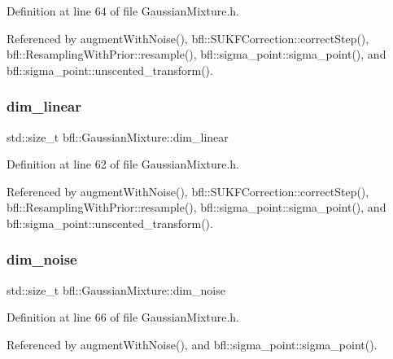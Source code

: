 Definition at line 64 of file Gaussian\+Mixture.\+h.



Referenced by augment\+With\+Noise(), bfl\+::\+S\+U\+K\+F\+Correction\+::correct\+Step(), bfl\+::\+Resampling\+With\+Prior\+::resample(), bfl\+::sigma\+\_\+point\+::sigma\+\_\+point(), and bfl\+::sigma\+\_\+point\+::unscented\+\_\+transform().

\mbox{\label{classbfl_1_1GaussianMixture_a22a0fbc77f90d9d75e89d7898484c05a}} 
\subsubsection{\texorpdfstring{dim\+\_\+linear}{dim\_linear}}
{\footnotesize\ttfamily std\+::size\+\_\+t bfl\+::\+Gaussian\+Mixture\+::dim\+\_\+linear}



Definition at line 62 of file Gaussian\+Mixture.\+h.



Referenced by augment\+With\+Noise(), bfl\+::\+S\+U\+K\+F\+Correction\+::correct\+Step(), bfl\+::\+Resampling\+With\+Prior\+::resample(), bfl\+::sigma\+\_\+point\+::sigma\+\_\+point(), and bfl\+::sigma\+\_\+point\+::unscented\+\_\+transform().

\mbox{\label{classbfl_1_1GaussianMixture_adaa8d9c6d03be835769cc848aba81067}} 
\subsubsection{\texorpdfstring{dim\+\_\+noise}{dim\_noise}}
{\footnotesize\ttfamily std\+::size\+\_\+t bfl\+::\+Gaussian\+Mixture\+::dim\+\_\+noise}



Definition at line 66 of file Gaussian\+Mixture.\+h.



Referenced by augment\+With\+Noise(), and bfl\+::sigma\+\_\+point\+::sigma\+\_\+point().

\mbox{\label{classbfl_1_1GaussianMixture_a12a1175e838a753129f4cc133b2c1a9c}} 
